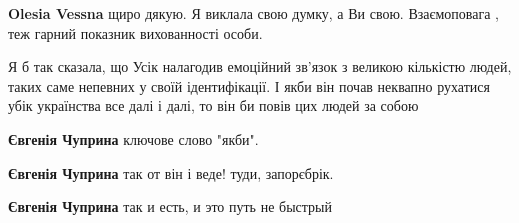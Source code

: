 \begin{itemize}
\begin{itemize}
\textbf{Olesia Vessna} щиро дякую. Я виклала свою
думку, а Ви свою. Взаємоповага , теж гарний показник вихованності особи.
\end{itemize} %


Я б так сказала, що Усік налагодив емоційний зв'язок з великою кількістю людей,
таких саме непевних у своїй ідентифікації. І якби він почав неквапно рухатися
убік українства все далі і далі, то він би повів цих людей за собою

\begin{itemize} %
\textbf{Євгенія Чуприна} ключове слово "якби".

\textbf{Євгенія Чуприна} так от він і веде!
туди, запорєбрік.

\textbf{Євгенія Чуприна} так и есть, и это путь не быстрый
\end{itemize} %

\end{itemize} %

